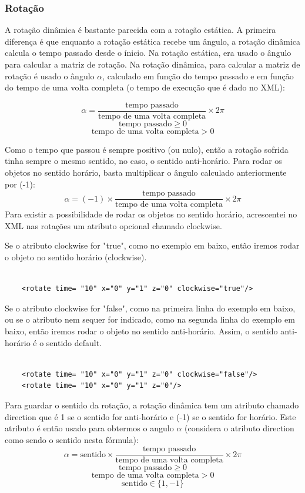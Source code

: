 \documentclass[12pt, a4paper]{article}
\begin{document}
\subsubsection{Rotação}

A rotação dinâmica é bastante parecida com a rotação estática. A primeira diferença é que enquanto a
rotação estática recebe um ângulo, a rotação dinâmica calcula o tempo passado desde o ínicio. Na
rotação estática, era usado o ângulo para calcular a matriz de rotação. Na rotação dinâmica, para
calcular a matriz de rotação é usado o ângulo $\alpha$, calculado em função do tempo passado e em
função do tempo de uma volta completa (o tempo de execução que é dado no XML):

$$
\alpha = \frac{\text{tempo passado}}{\text{tempo de uma volta completa}} \times 2\pi
$$
$$
$$
$$
\text{tempo passado} \geq 0
$$
$$
\text{tempo de uma volta completa} > 0
$$

Como o tempo que passou é sempre positivo (ou nulo), então a rotação sofrida tinha sempre o
mesmo sentido, no caso, o sentido anti-horário. Para rodar os objetos no sentido
horário, basta multiplicar o ângulo calculado anteriormente por (-1):
$$
\alpha = (-1) \times \frac{\text{tempo passado}}{\text{tempo de uma volta completa}} \times 2\pi
$$
Para existir a possibilidade de rodar os objetos no sentido horário, acrescentei no XML nas
rotações um atributo opcional chamado clockwise.

Se o atributo clockwise for "true", como no exemplo em baixo, então iremos rodar o objeto no
sentido horário (clockwise).
\lstset{language=xml}
\begin{lstlisting}

    <rotate time= "10" x="0" y="1" z="0" clockwise="true"/>

\end{lstlisting}
Se o atributo clockwise for "false", como na primeira linha do exemplo em baixo, ou se o
atributo nem sequer for indicado, como na segunda linha do exemplo em baixo, então iremos
rodar o objeto no sentido anti-horário. Assim, o sentido anti-horário é o sentido default.
\lstset{language=xml}
\begin{lstlisting}

    <rotate time= "10" x="0" y="1" z="0" clockwise="false"/>
    <rotate time= "10" x="0" y="1" z="0"/>

\end{lstlisting}
Para guardar o sentido da rotação, a rotação dinâmica tem um atributo chamado direction
que é 1 se o sentido for anti-horário e (-1) se o sentido for horário. Este atributo é
então usado para obtermos o angulo $\alpha$ (considera o atributo direction como sendo
o sentido nesta fórmula):
$$
\alpha = \text{sentido} \times \frac{\text{tempo passado}}{\text{tempo de uma volta completa}}
\times 2\pi
$$
$$
$$
$$
\text{tempo passado} \geq 0
$$
$$
\text{tempo de uma volta completa} > 0
$$
$$
\text{sentido} \in \{ 1, -1 \}
$$
\end{document}
